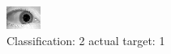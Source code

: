 \begin{figure}[h!]
\begin{center}
\includegraphics[width=0.60\columnwidth]{figures/ID1477_class_2_target_1.png}
\end{center}
\caption{ Classification: 2 actual target: 1}
\label{fig:ID1477_class_2_target_1}
\end{figure}
